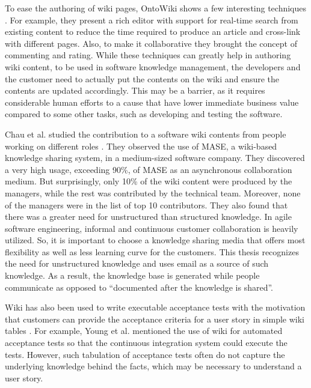 To ease the authoring of wiki pages, OntoWiki shows a few interesting techniques \cite{ontowiki}. For example, they present a rich editor with support for real-time search from existing content to reduce the time required to produce an article and cross-link with different pages. Also, to make it collaborative they brought the concept of commenting and rating. While these techniques can greatly help in authoring wiki content, to be used in software knowledge management, the developers and the customer need to actually put the contents on the wiki and ensure the contents are updated accordingly. This may be a barrier, as it requires considerable human efforts to a cause that have lower immediate business value compared to some other tasks, such as developing and testing the software.

Chau et al. studied the contribution to a software wiki contents from people working on different roles \cite{a_case_study_of_wiki}. They observed the use of MASE, a wiki-based knowledge sharing system, in a medium-sized software company. They discovered a very high usage, exceeding 90\%, of MASE as an asynchronous collaboration medium. But surprisingly, only 10\% of the wiki content were produced by the managers, while the rest was contributed by the technical team. Moreover, none of the managers were in the list of top 10 contributors. They also found that there was a greater need for unstructured than structured knowledge. In agile software engineering, informal and continuous customer collaboration is heavily utilized. So, it is important to choose a knowledge sharing media that offers most flexibility as well as less learning curve for the customers. This thesis recognizes the need for unstructured knowledge and uses email as a source of such knowledge. As a result, the knowledge base is generated while people communicate as opposed to ``documented after the knowledge is shared''.

Wiki has also been used to write executable acceptance tests with the motivation that customers can provide the acceptance criteria for a user story in simple wiki tables \cite{fitnesse}. For example, Young et al. mentioned the use of wiki for automated acceptance tests so that the continuous integration system could execute the tests\cite{how_did_we}. However, such tabulation of acceptance tests often do not capture the underlying knowledge behind the facts, which may be necessary to understand a user story.

